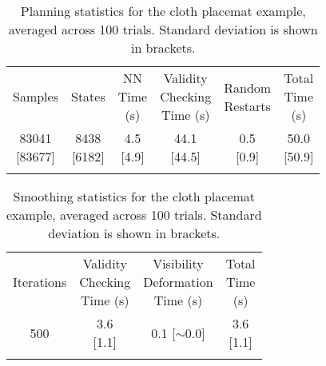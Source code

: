 \begin{table*}[ht]
\centering
\caption{Planning statistics for the cloth placemat example, averaged across 100 trials. Standard deviation is shown in brackets.}
\label{tab:live_robot_stats_planning}
\begin{tabular}{cccccc}
\noalign{\smallskip}\hline\noalign{\smallskip}
Samples & 
States &
\makecell{NN\\Time\\(s)} & 
\makecell{Validity\\Checking\\Time (s)} & 
\makecell{Random\\Restarts} &
\makecell{Total\\Time\\(s)} \\
\noalign{\smallskip}\hline\noalign{\smallskip}
\makecell{83041\\{[83677]}} &
\makecell{8438\\{[6182]}} &
\makecell{4.5\\{[4.9]}} &
\makecell{44.1\\{[44.5]}} &
\makecell{0.5\\{[0.9]}} &
\makecell{50.0\\{[50.9]}} \\
\noalign{\smallskip}\hline
\end{tabular}
\end{table*}

\begin{table}[ht]
\centering
\caption{Smoothing statistics for the cloth placemat example, averaged across 100 trials. Standard deviation is shown in brackets.}
\label{tab:live_robot_stats_smoothing}
\begin{tabular}{cccc}
\noalign{\smallskip}\hline\noalign{\smallskip}
Iterations & 
\makecell{Validity\\Checking\\Time (s)} &
\makecell{Visibility\\Deformation\\Time (s)} &
\makecell{Total\\Time\\(s)} \\
\noalign{\smallskip}\hline\noalign{\smallskip}
500 &
\makecell{3.6\\{[1.1]}} &
\makecell{0.1\\{[$\sim$0.0]}} &
\makecell{3.6\\{[1.1]}} \\
\noalign{\smallskip}\hline
\end{tabular}
\end{table}



